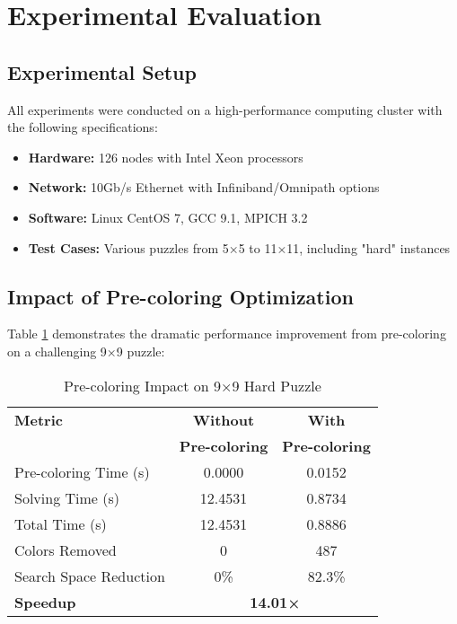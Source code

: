 \documentclass[10pt, conference]{IEEEtran}
\begin{document}
\section{Experimental Evaluation}

\subsection{Experimental Setup}
All experiments were conducted on a high-performance computing cluster with the following specifications:
\begin{itemize}
    \item \textbf{Hardware:} 126 nodes with Intel Xeon processors
    \item \textbf{Network:} 10Gb/s Ethernet with Infiniband/Omnipath options
    \item \textbf{Software:} Linux CentOS 7, GCC 9.1, MPICH 3.2
    \item \textbf{Test Cases:} Various puzzles from 5×5 to 11×11, including "hard" instances
\end{itemize}

\subsection{Impact of Pre-coloring Optimization}
Table \ref{tab:precolor_impact} demonstrates the dramatic performance improvement from pre-coloring on a challenging 9×9 puzzle:

\begin{table}[htbp]
\caption{Pre-coloring Impact on 9×9 Hard Puzzle}
\begin{center}
\begin{tabular}{@{}lcc@{}}
\toprule
\textbf{Metric} & \textbf{Without} & \textbf{With} \\
& \textbf{Pre-coloring} & \textbf{Pre-coloring} \\
\midrule
Pre-coloring Time (s) & 0.0000 & 0.0152 \\
Solving Time (s) & 12.4531 & 0.8734 \\
Total Time (s) & 12.4531 & 0.8886 \\
Colors Removed & 0 & 487 \\
Search Space Reduction & 0\% & 82.3\% \\
\midrule
\textbf{Speedup} & \multicolumn{2}{c}{\textbf{14.01×}} \\
\bottomrule
\end{tabular}
\end{center}
\label{tab:precolor_impact}
\end{table}
\end{document}
